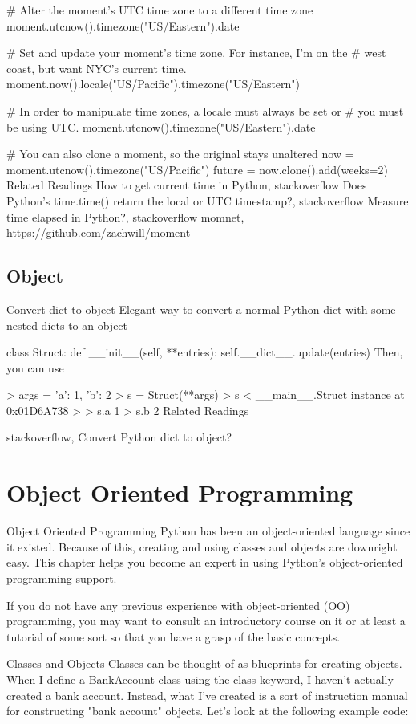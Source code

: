 # Alter the moment's UTC time zone to a different time zone
moment.utcnow().timezone("US/Eastern").date

# Set and update your moment's time zone. For instance, I'm on the
# west coast, but want NYC's current time.
moment.now().locale("US/Pacific").timezone("US/Eastern")

# In order to manipulate time zones, a locale must always be set or
# you must be using UTC.
moment.utcnow().timezone("US/Eastern").date

# You can also clone a moment, so the original stays unaltered
now = moment.utcnow().timezone("US/Pacific")
future = now.clone().add(weeks=2)
Related Readings
How to get current time in Python, stackoverflow
Does Python's time.time() return the local or UTC timestamp?, stackoverflow
Measure time elapsed in Python?, stackoverflow
momnet, https://github.com/zachwill/moment

\subsection{Object}

Convert dict to object
Elegant way to convert a normal Python dict with some nested dicts to an object

class Struct:
    def __init__(self, **entries):
        self.__dict__.update(entries)
Then, you can use

> args = {'a': 1, 'b': 2}
> s = Struct(**args)
> s
< __main__.Struct instance at 0x01D6A738 >
> s.a
1
> s.b
2
Related Readings

stackoverflow, Convert Python dict to object?

\section{Object Oriented Programming}

Object Oriented Programming
Python has been an object-oriented language since it existed. Because of this, creating and using classes and objects are downright easy. This chapter helps you become an expert in using Python's object-oriented programming support.

If you do not have any previous experience with object-oriented (OO) programming, you may want to consult an introductory course on it or at least a tutorial of some sort so that you have a grasp of the basic concepts.

Classes and Objects
Classes can be thought of as blueprints for creating objects. When I define a BankAccount class using the class keyword, I haven't actually created a bank account. Instead, what I've created is a sort of instruction manual for constructing "bank account" objects. Let's look at the following example code:

